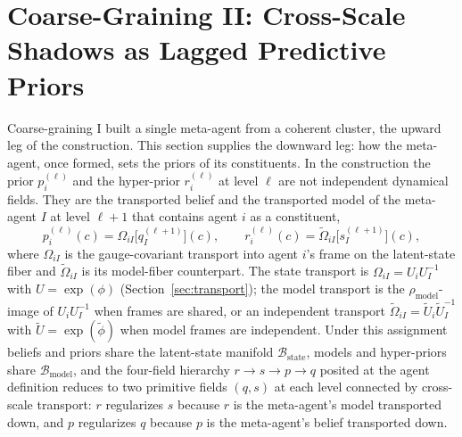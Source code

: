 \documentclass[11pt]{article}
\begin{document}
\section{Coarse-Graining II: Cross-Scale Shadows as Lagged Predictive Priors}\label{sec:cross_scale_shadows}

Coarse-graining I built a single meta-agent from a coherent cluster, the upward leg of the construction. This section supplies the downward leg: how the meta-agent, once formed, sets the priors of its constituents. In the construction the prior $p_i^{(\ell)}$ and the hyper-prior $r_i^{(\ell)}$ at level $\ell$ are not independent dynamical fields. They are the transported belief and the transported model of the meta-agent $I$ at level $\ell+1$ that contains agent $i$ as a constituent,
\begin{equation}
p_i^{(\ell)}(c) = \Omega_{iI}\big[q_I^{(\ell+1)}\big](c),
\qquad
r_i^{(\ell)}(c) = \tilde\Omega_{iI}\big[s_I^{(\ell+1)}\big](c),
\label{eq:cross_scale_shadow}
\end{equation}
where $\Omega_{iI}$ is the gauge-covariant transport into agent $i$'s frame on the latent-state fiber and $\tilde\Omega_{iI}$ is its model-fiber counterpart. The state transport is $\Omega_{iI} = U_i U_I^{-1}$ with $U = \exp(\phi)$ (Section~\ref{sec:transport}); the model transport is the $\rho_{\mathrm{model}}$-image of $U_i U_I^{-1}$ when frames are shared, or an independent transport $\tilde\Omega_{iI} = \tilde U_i \tilde U_I^{-1}$ with $\tilde U = \exp(\tilde\phi)$ when model frames are independent. Under this assignment beliefs and priors share the latent-state manifold $\mathcal{B}_{\mathrm{state}}$, models and hyper-priors share $\mathcal{B}_{\mathrm{model}}$, and the four-field hierarchy $r \to s \to p \to q$ posited at the agent definition reduces to two primitive fields $(q, s)$ at each level connected by cross-scale transport: $r$ regularizes $s$ because $r$ is the meta-agent's model transported down, and $p$ regularizes $q$ because $p$ is the meta-agent's belief transported down.
\end{document}
